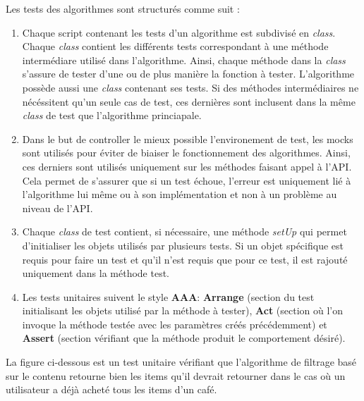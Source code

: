 \documentclass[11pt]{article}
\begin{document}
Les tests des algorithmes sont structurés comme suit :
\begin{enumerate}
	\item Chaque script contenant les tests d'un algorithme est subdivisé en \textit{class}. Chaque \textit{class} contient les différents tests correspondant à une méthode intermédiare utilisé dans l'algorithme. Ainsi, chaque méthode dans la \textit{class} s'assure de tester d'une ou de plus manière la fonction à tester. L'algorithme possède aussi une \textit{class} contenant ses tests. Si des méthodes intermédiaires ne nécéssitent qu'un seule cas de test, ces dernières sont inclusent dans la même \textit{class} de test que l'algorithme princiapale.
	
	\item Dans le but de controller le mieux possible l'environement de test, les mocks sont utilisés pour éviter de biaiser le fonctionnement des algorithmes. Ainsi, ces derniers sont utilisés uniquement sur les méthodes faisant appel à l'API. Cela permet de s'assurer que si un test échoue, l'erreur est uniquement lié à l'algorithme lui même ou à son implémentation et non à un problème au niveau de l'API.
	
	\item Chaque \textit{class} de test contient, si nécessaire, une méthode \textit{setUp} qui permet d'initialiser les objets utilisés par plusieurs tests. Si un objet spécifique est requis pour faire un test et qu'il n'est requis que pour ce test, il est rajouté uniquement dans la méthode test.
	
	\item Les tests unitaires suivent le style \textbf{AAA}: \textbf{Arrange} (section du test initialisant les objets utilisé par la méthode à tester), \textbf{Act} (section où l’on invoque la méthode testée avec les paramètres créés précédemment) et \textbf{Assert} (section vérifiant que la méthode produit le comportement désiré).\\
\end{enumerate}

La figure ci-dessous est un test unitaire vérifiant que l'algorithme de filtrage basé sur le contenu retourne bien les items qu'il devrait retourner dans le cas où un utilisateur a déjà acheté tous les items d'un café.
\end{document}
